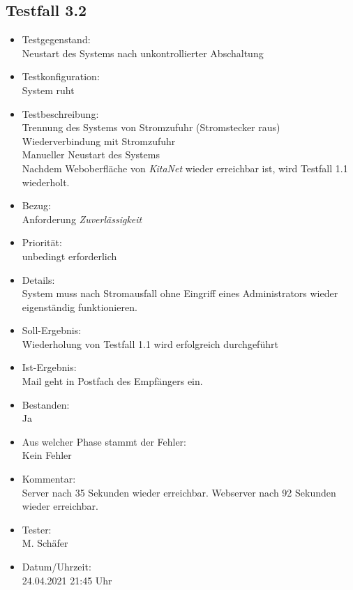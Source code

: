 \subsection{Testfall 3.2}
\begin{itemize}
	\item Testgegenstand:\\
Neustart des Systems nach unkontrollierter Abschaltung
	\item Testkonfiguration:\\
	System ruht
	\item Testbeschreibung:\\
	Trennung des Systems von Stromzufuhr (Stromstecker raus)\\
	Wiederverbindung mit Stromzufuhr\\
	Manueller Neustart des Systems\\
	Nachdem Weboberfläche von \textit{KitaNet} wieder erreichbar ist, wird Testfall 1.1 wiederholt.
	\item Bezug:\\
	Anforderung \textit{Zuverlässigkeit}
	\item Priorität:\\
	unbedingt erforderlich
	\item Details:\\
	System muss nach Stromausfall ohne Eingriff eines Administrators wieder eigenständig  funktionieren.
	\item Soll-Ergebnis:\\
	Wiederholung von Testfall 1.1 wird erfolgreich durchgeführt
	\item Ist-Ergebnis:\\
	Mail geht in Postfach des Empfängers ein.
	\item Bestanden:\\
	Ja
	\item Aus welcher Phase stammt der Fehler:\\
	Kein Fehler
	\item Kommentar:\\
	Server nach 35 Sekunden wieder erreichbar.
	Webserver nach 92 Sekunden wieder erreichbar.
	\item Tester:\\
	M. Schäfer
	\item Datum/Uhrzeit:\\
	24.04.2021 21:45 Uhr
\end{itemize}



